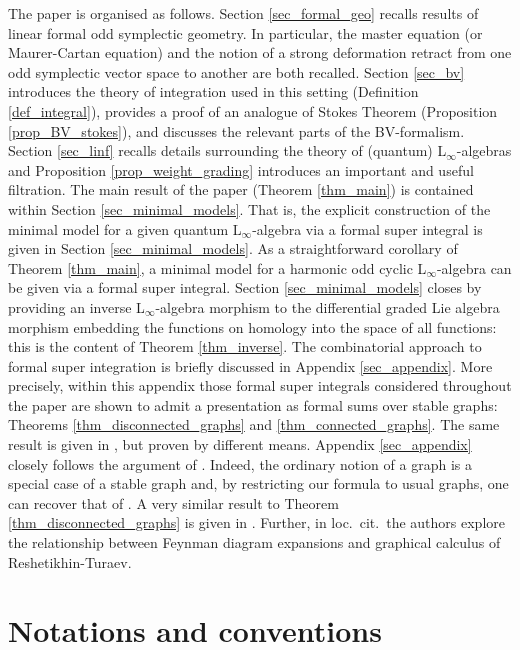 \documentclass[]{amsart}
\theoremstyle{definition}
\newcommand{\Linf}{L$_\infty$}
\begin{document}
The paper is organised as follows. Section \ref{sec_formal_geo} recalls results of linear formal odd symplectic geometry. In particular, the master equation (or Maurer-Cartan equation) and the notion of a strong deformation retract from one odd symplectic vector space to another are both recalled. Section \ref{sec_bv} introduces the theory of integration used in this setting (Definition \ref{def_integral}), provides a proof of an analogue of Stokes Theorem (Proposition \ref{prop_BV_stokes}), and discusses the relevant parts of the BV-formalism. Section \ref{sec_linf} recalls details surrounding the theory of (quantum) \Linf-algebras and Proposition \ref{prop_weight_grading} introduces an important and useful filtration. The main result of the paper (Theorem \ref{thm_main}) is contained within Section \ref{sec_minimal_models}. That is, the explicit construction of the minimal model for a given quantum \Linf-algebra via a formal super integral is given in Section \ref{sec_minimal_models}. As a straightforward corollary of Theorem \ref{thm_main}, a minimal model for a harmonic odd cyclic \Linf-algebra can be given via a formal super integral. Section \ref{sec_minimal_models} closes by providing an inverse \Linf-algebra morphism to the differential graded Lie algebra morphism embedding the functions on homology into the space of all functions: this is the content of Theorem \ref{thm_inverse}. The combinatorial approach to formal super integration is briefly discussed in Appendix \ref{sec_appendix}. More precisely, within this appendix those formal super integrals considered throughout the paper are shown to admit a presentation as formal sums over stable graphs: Theorems \ref{thm_disconnected_graphs} and \ref{thm_connected_graphs}. The same result is given in \cite{costello}, but proven by different means. Appendix \ref{sec_appendix} closely follows the argument of \cite{etingof}. Indeed, the ordinary notion of a graph is a special case of a stable graph and, by restricting our formula to usual graphs, one can recover that of \cite{etingof}. A very similar result to Theorem \ref{thm_disconnected_graphs} is given in \cite[Example 3.10]{fiorenza_murri}. Further, in loc.~cit.~the authors explore the relationship between Feynman diagram expansions and graphical calculus of Reshetikhin-Turaev.

\section*{Notations and conventions}
\end{document}
